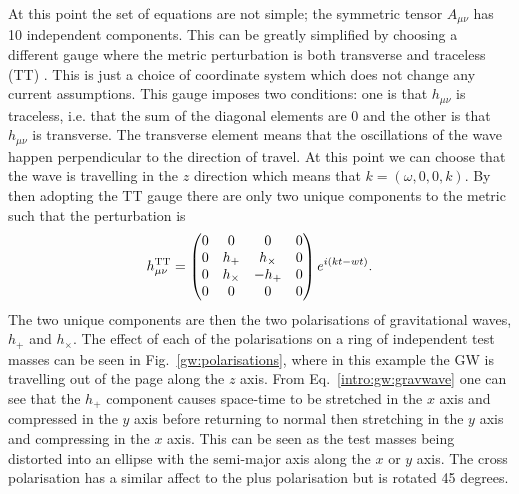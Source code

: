 At this point the set of equations are not simple; the symmetric tensor $A_{\mu \nu}$ has 10 independent
components. This can be greatly
simplified by choosing a different gauge where the metric perturbation is both
transverse and traceless (TT) \citep{flanagan2005BasicsGravitational}.  This is
just a choice of coordinate system which does not change any current
assumptions. This gauge imposes two conditions: one
is that $h_{\mu \nu}$ is traceless, i.e. that the sum of the diagonal elements
are 0 and the other is that $h_{\mu \nu}$ is transverse.  The transverse
element means that the oscillations of the wave happen perpendicular to the
direction of travel.  At this point we can choose that the wave is travelling in
the $z$ direction which means that $k = (\omega,0,0,k)$.  By then adopting the
TT gauge there are only two unique components to the metric such that the
perturbation is
\begin{equation}
\label{intro:gw:gravwave}
h_{\mu \nu}^{\rm{TT}} = \left( 
\begin{matrix}
0 & 0 & 0 & 0 \\
0 & h_{+} & h_{\times} & 0 \\
0 & h_{\times} & -h_{+} & 0 \\
0 & 0 & 0 & 0 \\
\end{matrix}
\right) 
e^{i(kt - wt)}.
\end{equation}
The two unique components are then the two polarisations of gravitational
waves, $h_{+}$ and $h_{\times}$. The effect of each of the polarisations on a ring of independent test masses can be seen in Fig.~\ref{gw:polarisations}, where in this example the \gls{GW} is travelling out of the page along the $z$ axis.
From Eq.~\ref{intro:gw:gravwave} one can see that the $h_{+}$ component causes space-time to be stretched in the $x$ axis and compressed in the $y$ axis before returning to normal then stretching in the $y$ axis and compressing in the $x$ axis. This can be seen as the test masses being distorted into an ellipse with the semi-major axis along the $x$ or $y$ axis.
The cross polarisation has a similar affect to the plus polarisation but is rotated 45 degrees.
%
